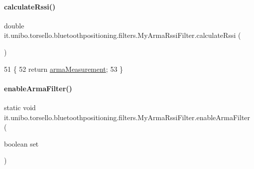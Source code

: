 \paragraph{\texorpdfstring{calculate\+Rssi()}{calculateRssi()}}
{\footnotesize\ttfamily double it.\+unibo.\+torsello.\+bluetoothpositioning.\+filters.\+My\+Arma\+Rssi\+Filter.\+calculate\+Rssi (\begin{DoxyParamCaption}{ }\end{DoxyParamCaption})}


\begin{DoxyCode}
51                                   \{
52         \textcolor{keywordflow}{return} \hyperlink{classit_1_1unibo_1_1torsello_1_1bluetoothpositioning_1_1filters_1_1MyArmaRssiFilter_ac386c808d409a1e6fc68801a3c2cf4b9_ac386c808d409a1e6fc68801a3c2cf4b9}{armaMeasurement};
53     \}
\end{DoxyCode}
\hypertarget{classit_1_1unibo_1_1torsello_1_1bluetoothpositioning_1_1filters_1_1MyArmaRssiFilter_a36d7f50fdd722fe01bf86f21246d4151_a36d7f50fdd722fe01bf86f21246d4151}{}\label{classit_1_1unibo_1_1torsello_1_1bluetoothpositioning_1_1filters_1_1MyArmaRssiFilter_a36d7f50fdd722fe01bf86f21246d4151_a36d7f50fdd722fe01bf86f21246d4151} 
\paragraph{\texorpdfstring{enable\+Arma\+Filter()}{enableArmaFilter()}}
{\footnotesize\ttfamily static void it.\+unibo.\+torsello.\+bluetoothpositioning.\+filters.\+My\+Arma\+Rssi\+Filter.\+enable\+Arma\+Filter (\begin{DoxyParamCaption}\item[{boolean}]{set }\end{DoxyParamCaption})\hspace{0.3cm}{\ttfamily [static]}}


